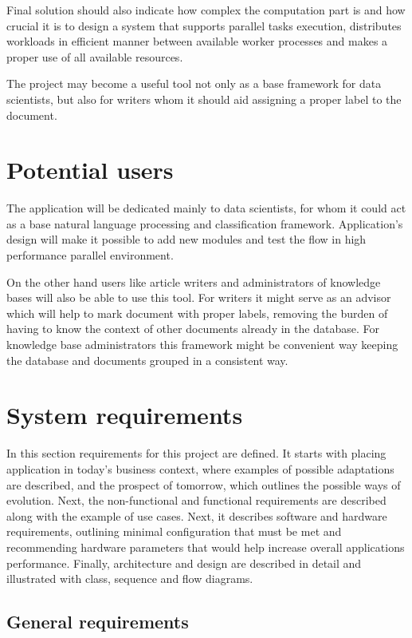 Final solution should also indicate how complex the computation part is and how crucial it is to design a system that supports parallel tasks execution, distributes workloads in efficient manner between available worker processes and makes a proper use of all available resources.

The project may become a useful tool not only as a base framework for data scientists, but also for writers whom it should aid assigning a proper label to the document.

\section{Potential users} \label{design-users}
The application will be dedicated mainly to data scientists, for whom it could act as a base natural language processing and classification framework. Application's design will make it possible to add new modules and test the flow in high performance parallel environment.

On the other hand users like article writers and administrators of knowledge bases will also be able to use this tool. For writers it might serve as an advisor which will help to mark document with proper labels, removing the burden of having to know the context of other documents already in the database. For knowledge base administrators this framework might be convenient way keeping the database and documents grouped in a consistent way.

\section{System requirements}
In this section requirements for this project are defined. It starts with placing application in today's business context, where examples of possible adaptations are described, and the prospect of tomorrow, which outlines the possible ways of evolution. Next, the non-functional and functional requirements are described along with the example of use cases. Next, it describes software and hardware requirements, outlining minimal configuration that must be met and recommending hardware parameters that would help increase overall applications performance. Finally, architecture and design are described in detail and illustrated with class, sequence and flow diagrams.

\subsection{General requirements}
	
